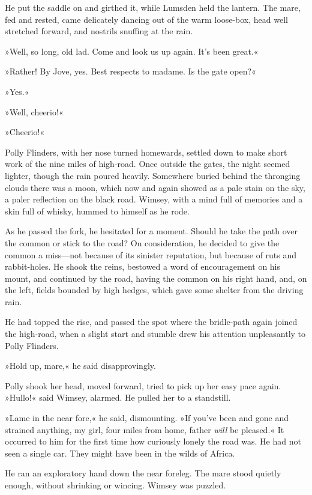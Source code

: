 He put the saddle on and girthed it, while Lumsden held the lantern. The mare, fed and rested, came delicately dancing out of the warm loose-box, head well stretched forward, and nostrils snuffing at the rain.

»Well, so long, old lad. Come and look us up again. It's been great.«

»Rather! By Jove, yes. Best respects to madame. Is the gate open?«

»Yes.«

»Well, cheerio!«

»Cheerio!«

Polly Flinders, with her nose turned homewards, settled down to make short work of the nine miles of high-road. Once outside the gates, the night seemed lighter, though the rain poured heavily. Somewhere buried behind the thronging clouds there was a moon, which now and again showed as a pale stain on the sky, a paler reflection on the black road. Wimsey, with a mind full of memories and a skin full of whisky, hummed to himself as he rode.

As he passed the fork, he hesitated for a moment. Should he take the path over the common or stick to the road? On consideration, he decided to give the common a miss—not because of its sinister reputation, but because of ruts and rabbit-holes. He shook the reins, bestowed a word of encouragement on his mount, and continued by the road, having the common on his right hand, and, on the left, fields bounded by high hedges, which gave some shelter from the driving rain.

He had topped the rise, and passed the spot where the bridle-path again joined the high-road, when a slight start and stumble drew his attention unpleasantly to Polly Flinders.

»Hold up, mare,« he said disapprovingly.

Polly shook her head, moved forward, tried to pick up her easy pace again. »Hullo!« said Wimsey, alarmed. He pulled her to a standstill.

»Lame in the near fore,« he said, dismounting. »If you've been and gone and strained anything, my girl, four miles from home, father \textit{will} be pleased.« It occurred to him for the first time how curiously lonely the road was. He had not seen a single car. They might have been in the wilds of Africa.

He ran an exploratory hand down the near foreleg. The mare stood quietly enough, without shrinking or wincing. Wimsey was puzzled.


